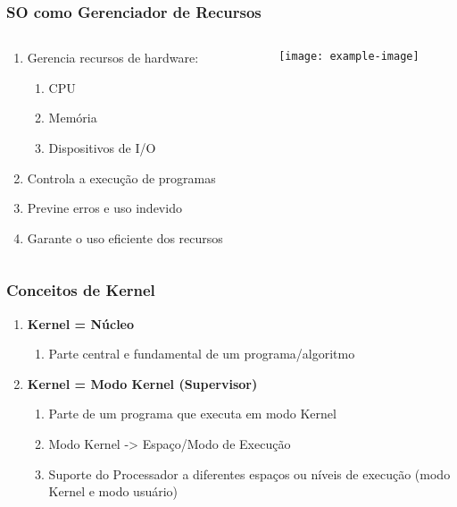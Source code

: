 \documentclass{beamer}
\begin{document}
\begin{frame}[fragile]
\frametitle{SO como Gerenciador de Recursos}

\begin{columns}
    \begin{column}{0.5\textwidth}
        \begin{enumerate}
            \item Gerencia recursos de hardware:
            \begin{enumerate}
                \item CPU
                \item Memória
                \item Dispositivos de I/O
            \end{enumerate}
            \item Controla a execução de programas
            \item Previne erros e uso indevido
            \item Garante o uso eficiente dos recursos
        \end{enumerate}
    \end{column}
    
    \begin{column}{0.5\textwidth}
        \begin{center}
            \texttt{[image: example-image]}
        \end{center}
    \end{column}
\end{columns}
\end{frame}

\begin{frame}[fragile]
\frametitle{Conceitos de Kernel}

\begin{enumerate}
    \vfill \item \textbf{Kernel = Núcleo}
    \begin{enumerate}
        \item Parte central e fundamental de um programa/algoritmo
    \end{enumerate}
    
    \vfill \item \textbf{Kernel = Modo Kernel (Supervisor)}
    \begin{enumerate}
        \item Parte de um programa que executa em modo Kernel
        \item Modo Kernel -> Espaço/Modo de Execução
        \item Suporte do Processador a diferentes espaços ou níveis de execução (modo Kernel e modo usuário)
    \end{enumerate}
\end{enumerate}
\end{frame}
\end{document}
